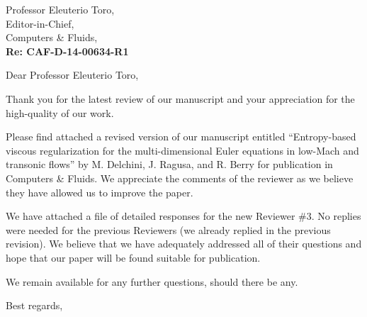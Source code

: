 \begin{letter}{Professor Eleuterio Toro, \\  Editor-in-Chief,\\
    Computers \& Fluids,\\
\textbf{Re: CAF-D-14-00634-R1}}


\date{\today}

\opening{Dear Professor Eleuterio Toro,}
         \vspace{0.25cm}

Thank you for the latest review of our manuscript and your appreciation for the high-quality of our work.

Please find attached  a revised version of our manuscript entitled
``Entropy-based viscous regularization for the multi-dimensional Euler equations in low-Mach and transonic flows''
by M. Delchini, J. Ragusa, and R. Berry for
publication in Computers \& Fluids. We appreciate the comments of the reviewer as we
believe they have allowed us to improve the paper.

We have attached a file of detailed responses for the new Reviewer \#3.
No replies were needed for the previous Reviewers (we already replied in the previous revision). 
We believe that we have adequately addressed all of their questions and hope that our paper will be found suitable for publication.

%
%
\bigskip

We remain available for any further questions, should there be any.



\closing{Best regards, }

\end{letter}



